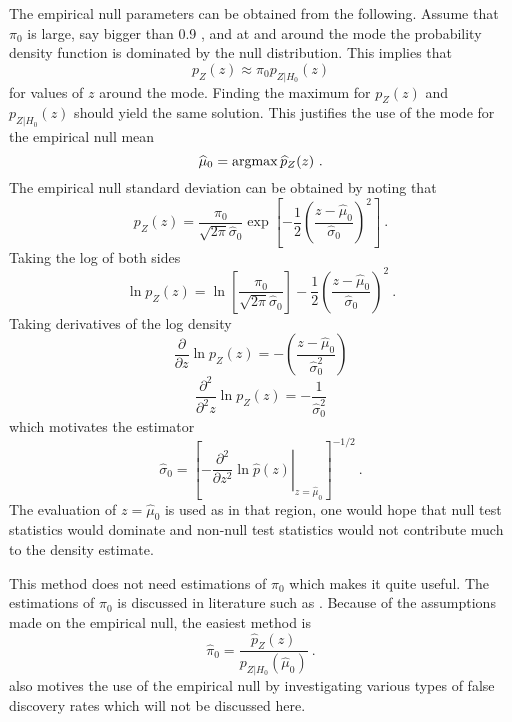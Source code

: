 The empirical null parameters can be obtained from the following. Assume that $\pi_0$ is large, say bigger than 0.9 \citep{efron2004large}, and at and around the mode the probability density function is dominated by the null distribution. This implies that
\begin{equation}
	p_{Z}(z) \approx \pi_0 p_{Z|H_0}(z)
\end{equation}
for values of $z$ around the mode. Finding the maximum for $p_{Z}(z)$ and $p_{Z|H_0}(z)$ should yield the same solution. This justifies the use of the mode for the empirical null mean \citep{efron2004large}
\begin{equation}
	\widehat{\mu}_0 = \argmax\widehat{p}_Z(z) \ .
\end{equation} 
The empirical null standard deviation can be obtained by noting that
\begin{equation}
	p_{Z}(z) = 
	\dfrac{\pi_0}{\sqrt{2\pi}\widehat{\sigma}_0}
	\exp\left[
		-\dfrac{1}{2}
		\left(
			\dfrac{z-\widehat{\mu}_0}{\widehat{\sigma}_0}
		\right)^2
	\right] \ .
\end{equation}
Taking the log of both sides
\begin{equation}
	\ln p_{Z}(z) = 
	\ln\left[
		\dfrac{\pi_0}{\sqrt{2\pi}\widehat{\sigma}_0}
	\right]
	-\dfrac{1}{2}
	\left(
		\dfrac{z-\widehat{\mu}_0}{\widehat{\sigma}_0}
	\right)^2
	\ .
\end{equation}
Taking derivatives of the log density
\begin{equation}
	\dfrac{\partial}{\partial z} \ln p_{Z}(z) =
	-\left(
		\dfrac{
			z-\widehat{\mu}_0
		}
		{
			\widehat{\sigma}_0^2
		}
	\right)
\end{equation}
\begin{equation}
	\dfrac{\partial^2}{\partial^2 z} \ln p_{Z}(z) =
	-\dfrac{
		1
	}
	{
		\widehat{\sigma}_0^2
	}
\end{equation}
which motivates the estimator \citep{efron2004large}
\begin{equation}
	\widehat{\sigma}_0 = \left[
		\left.
			-\dfrac{\partial^2}{\partial z^2}\ln\widehat{p}(z)
		\right|_{z=\widehat{\mu}_0}
	\right]^{-1/2}
	\ .
\end{equation}
The evaluation of $z=\widehat{\mu}_0$ is used as in that region, one would hope that null test statistics would dominate and non-null test statistics would not contribute much to the density estimate.

This method does not need estimations of $\pi_0$ which makes it quite useful. The estimations of $\pi_0$ is discussed in literature such as \cite{benjamini2000adaptive, pounds2003estimating, storey2003statistical, pounds2004improving, langaas2005estimating, durnez2014posthoc}. Because of the assumptions made on the empirical null, the easiest method is
\begin{equation}
	\widehat{\pi}_0 = \dfrac{\widehat{p}_Z(z)}{p_{Z|H_0}(\widehat{\mu}_0)}
	\ .
\end{equation}
\cite{efron2004large} also motives the use of the empirical null by investigating various types of false discovery rates \citep{storey2002direct, storey2003positive, efron2002empirical, efron2007size} which will not be discussed here.

